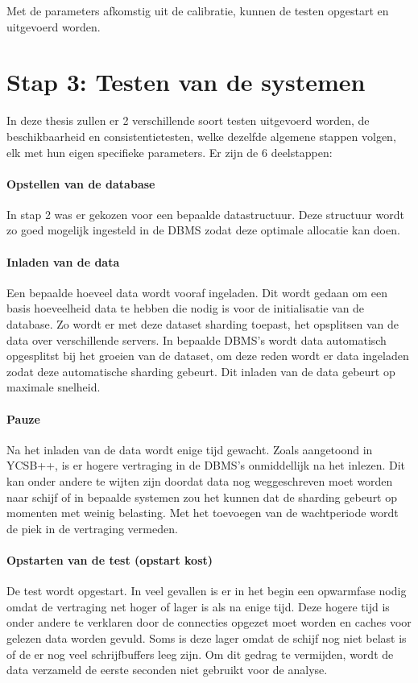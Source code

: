 Met de parameters afkomstig uit de calibratie, kunnen de testen opgestart en uitgevoerd worden. 

\section{Stap 3: Testen van de systemen} \label{sec:testenvandesystemen}
In deze thesis zullen er 2 verschillende soort testen uitgevoerd worden, de beschikbaarheid en consistentietesten, welke dezelfde algemene stappen volgen, elk met hun eigen specifieke parameters. Er zijn de 6 deelstappen: 

\paragraph{Opstellen van de database} In stap 2 was er gekozen voor een bepaalde datastructuur. Deze structuur wordt zo goed mogelijk ingesteld in de DBMS zodat deze optimale allocatie kan doen.

\paragraph{Inladen van de data} Een bepaalde hoeveel data wordt vooraf ingeladen. Dit wordt gedaan om een basis hoeveelheid data te hebben die nodig is voor de initialisatie van de database. Zo wordt er met deze dataset sharding toepast, het opsplitsen van de data over verschillende servers. In bepaalde DBMS's wordt data automatisch opgesplitst bij het groeien van de dataset, om deze reden wordt er data ingeladen zodat deze automatische sharding gebeurt. Dit inladen van de data gebeurt op maximale snelheid. 

\paragraph{Pauze} Na het inladen van de data wordt enige tijd gewacht. Zoals aangetoond in YCSB++\cite[Figuur 9]{patil2011ycsb++}, is er hogere vertraging in de DBMS's onmiddellijk na het inlezen. Dit kan onder andere te wijten zijn doordat data nog weggeschreven moet worden naar schijf of in bepaalde systemen zou het kunnen dat de sharding gebeurt op momenten met weinig belasting. Met het toevoegen van de wachtperiode wordt de piek in de vertraging vermeden. 

\paragraph{Opstarten van de test (opstart kost)} De test wordt opgestart. In veel gevallen is er in het begin een opwarmfase nodig omdat de vertraging net hoger of lager is als na enige tijd. Deze hogere tijd is onder andere te verklaren door de connecties opgezet moet worden en caches voor gelezen data worden gevuld. Soms is deze lager omdat de schijf nog niet belast is of de er nog veel schrijfbuffers leeg zijn. Om dit gedrag te vermijden, wordt de data verzameld de eerste seconden niet gebruikt voor de analyse. 

